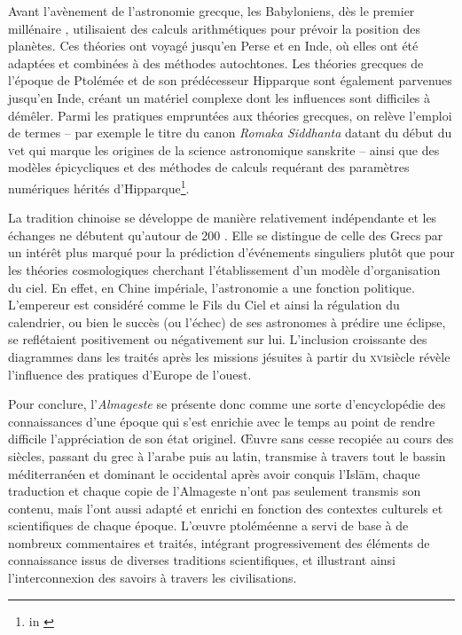 Avant l'avènement de l'astronomie grecque, les Babyloniens, dès le premier
millénaire \jc, utilisaient des calculs arithmétiques pour prévoir
la position des planètes. Ces théories ont voyagé jusqu'en Perse et en
Inde, où elles ont été adaptées et combinées à des méthodes autochtones.
Les théories grecques de l'époque de Ptolémée et de son prédécesseur
Hipparque sont également parvenues jusqu'en Inde, créant un matériel
complexe dont les influences sont difficiles à démêler. Parmi les
pratiques empruntées aux théories grecques, on relève l'emploi de termes
-- par exemple le titre du canon \emph{Romaka Siddhanta} datant du début
du \textsc{v}\ieme et qui marque les origines de la science astronomique sanskrite --
ainsi que des modèles épicycliques et des méthodes de calculs requérant
des paramètres numériques hérités d'Hipparque\footnote{\cite[p.6-7]{mercier_studies_2004} in \cite[p.15]{albouy_mediation_2019}}.

La tradition chinoise se développe de manière relativement indépendante
et les échanges ne débutent qu'autour de 200 \jc. Elle se distingue
de celle des Grecs par un intérêt plus marqué pour la prédiction
d'événements singuliers plutôt que pour les théories cosmologiques
cherchant l'établissement d'un modèle d'organisation du ciel. En effet,
en Chine impériale, l'astronomie a une fonction politique. L'empereur
est considéré comme le Fils du Ciel et ainsi la régulation du
calendrier, ou bien le succès (ou l'échec) de ses astronomes à prédire
une éclipse, se reflétaient positivement ou négativement sur lui.
L'inclusion croissante des diagrammes dans les traités après les
missions jésuites à partir du \textsc{xvi}\ieme siècle révèle l'influence des
pratiques d'Europe de l'ouest.

Pour conclure, l'\emph{Almageste} se présente donc comme une sorte
d'encyclopédie des connaissances d'une époque qui s'est enrichie avec le
temps au point de rendre difficile l'appréciation de son état originel.
Œuvre sans cesse recopiée au cours des siècles, passant du grec à
l'arabe puis au latin, transmise à travers tout le bassin méditerranéen
et dominant le \ma occidental après avoir conquis l'Islām, chaque
traduction et chaque copie de l'Almageste n'ont pas seulement transmis
son contenu, mais l'ont aussi adapté et enrichi en fonction des
contextes culturels et scientifiques de chaque époque. L'œuvre
ptoléméenne a servi de base à de nombreux commentaires et traités,
intégrant progressivement des éléments de connaissance issus de diverses
traditions scientifiques, et illustrant ainsi l'interconnexion des
savoirs à travers les civilisations.

